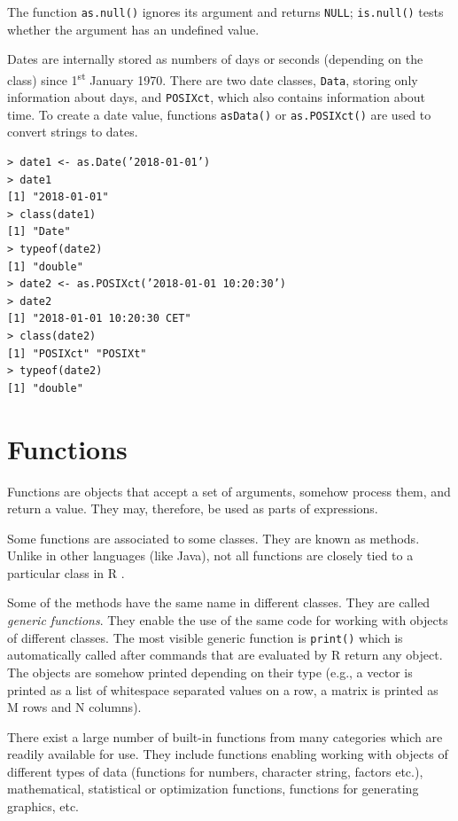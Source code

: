 The function \texttt{as.null()} ignores its argument and returns \texttt{NULL}; \texttt{is.null()}
tests whether the argument has an undefined value.

Dates are internally stored as numbers of days or seconds (depending on the
class) since 1\textsuperscript{st} January 1970. There are two date classes, \texttt{Data}, storing only
information about days, and \texttt{POSIXct}, which also contains information about
time. To create a date value, functions \texttt{asData()} or \texttt{as.POSIXct()} are used to
convert strings to dates.

\begin{verbatim}
> date1 <- as.Date(’2018-01-01’)
> date1
[1] "2018-01-01"
> class(date1)
[1] "Date"
> typeof(date2)
[1] "double"
> date2 <- as.POSIXct(’2018-01-01 10:20:30’)
> date2
[1] "2018-01-01 10:20:30 CET"
> class(date2)
[1] "POSIXct" "POSIXt"
> typeof(date2)
[1] "double"
\end{verbatim}

\section{Functions}

Functions are objects that accept a set of arguments, somehow process them, and
return a value. They may, therefore, be used as parts of expressions.

Some functions are associated to some classes. They are known as methods.
Unlike in other languages (like Java), not all functions are closely tied to a particular class in R \cite{ref4}.

Some of the methods have the same name in different classes. They are called
\textit{generic functions}. They enable the use of the same code for working with objects
of different classes. The most visible generic function is \texttt{print()} which is automatically called after commands that are evaluated by R return any object. The
objects are somehow printed depending on their type (e.g., a vector is printed as
a list of whitespace separated values on a row, a matrix is printed as M rows and
N columns).

There exist a large number of built-in functions from many categories which
are readily available for use. They include functions enabling working with objects of different types of data (functions for numbers, character string, factors
etc.), mathematical, statistical or optimization functions, functions for generating
graphics, etc.

